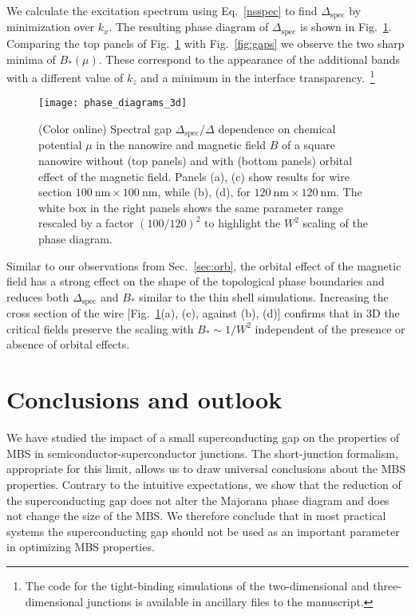 \documentclass[twocolumn, notitlepage, 10pt, aps, floatfix, showpacs, prb, citeautoscript]{revtex4-1}
\newcommand{\comment}[1]{}
\begin{document}
We calculate the excitation spectrum using Eq.~\eqref{nsspec} to find $\Delta_\mathrm{spec}$ by minimization over $k_x$.
The resulting phase diagram of $\Delta_\mathrm{spec}$ is shown in Fig.~\ref{fig:phase_diagrams_3d}.
Comparing the top panels of Fig.~\ref{fig:phase_diagrams_3d} with Fig.~\ref{fig:gaps} we observe the two sharp minima of $B_*(\mu)$.
These correspond to the appearance of the additional bands with a different value of $k_z$ and a minimum in the interface transparency.~\footnote{The code for the tight-binding simulations of the two-dimensional and three-dimensional junctions is available in ancillary files to the manuscript.}

\begin{figure}
\texttt{[image: phase\_diagrams\_3d]}
\caption{(Color online) Spectral gap $\Delta_\mathrm{spec}/\Delta$ dependence on chemical potential $\mu$ in the nanowire and magnetic field $B$ of a square nanowire without (top panels) and with (bottom panels) orbital effect of the magnetic field.
Panels (a), (c) show results for wire section $\SI{100}{\nm} \times \SI{100}{\nm}$, while (b), (d), for $\SI{120}{\nm} \times \SI{120}{\nm}$.
The white box in the right panels shows the same parameter range rescaled by a factor $\left(100/120\right)^2$ to highlight the $W^2$ scaling of the phase diagram.}
\label{fig:phase_diagrams_3d}
\end{figure}

Similar to our observations from Sec.~\ref{sec:orb}, the orbital effect of the magnetic field has a strong effect on the shape of the topological phase boundaries and reduces both $\Delta_\textrm{spec}$ and $B_*$ similar to the thin shell simulations.
Increasing the cross section of the wire [Fig.~\ref{fig:phase_diagrams_3d}(a), (c), against (b), (d)] confirms that in 3D the critical fields preserve the scaling with $B_*\sim 1/W^2$ independent of the presence or absence of orbital effects.

\section{Conclusions and outlook}
\label{sec:conc}

\comment{Superconducting gap is unimportant.}
We have studied the impact of a small superconducting gap on the properties of MBS in semiconductor-superconductor junctions.
The short-junction formalism, appropriate for this limit, allows us to draw universal conclusions about the MBS properties.
Contrary to the intuitive expectations, we show that the reduction of the superconducting gap does not alter the Majorana phase diagram and does not change the size of the MBS.
We therefore conclude that in most practical systems the superconducting gap should not be used as an important parameter in optimizing MBS properties.
\end{document}
